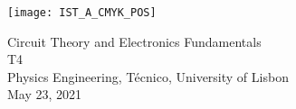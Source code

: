 
\thispagestyle {empty}

\texttt{[image: IST\_A\_CMYK\_POS]}

\begin{center}
%
\vspace{1.0cm}

\vspace{1cm}
{\FontLb Circuit Theory and Electronics Fundamentals} \\ %
\vspace{1cm}
{\FontLb T4} \\
\vspace{1cm}
{\FontSn Physics Engineering, Técnico, University of Lisbon} \\ %
\vspace{1cm}
{\FontSn May 23, 2021} \\ %
%
\end{center}

